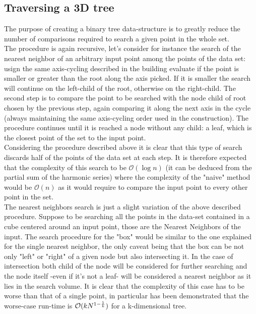 \subsection{Traversing a 3D tree}
The purpose of creating a binary tree data-structure is to greatly reduce the number of comparisons required to search a given point in the whole set.\\
The procedure is again recursive, let's consider for instance the search of the nearest neighbor of an arbitrary input point among the points of the data set: usign the same axis-cycling described in the building evaluate if the point is smaller or greater than the root along the axis picked. If it is smaller the search will continue on the left-child of the root, otherwise on the right-child. The second step is to compare the point to be searched with the node child of root chosen by the previous step, again comparing it along the next axis in the cycle (always maintaining the same axis-cycling order used in the construction). The procedure continues until it is reached a node without any child: a leaf, which is the closest point of the set to the input point.\\
Considering the procedure described above it is clear that this type of search discards half of the points of the data set at each step. It is therefore expected that the complexity of this search to be $\mathcal{O}(\log{} n)$ (it can be deduced from the partial sum of the harmonic series) where the complexity of the "naive" method would be $\mathcal{O}(n)$ as it would require to compare the input point to every other point in the set.\\
The nearest neighbors search is just a slight variation of the above described procedure. Suppose to be searching all the points in the data-set contained in a cube centered around an input point, those are the Nearest Neighbors of the input. The search procedure for the "box" would be similar to the one explained for the single nearest neighbor, the only caveat being that the box can be not only "left" or "right" of a given node but also intersecting it. In the case of intersection both child of the node will be considered for further searching and the node itself -even if it's not a leaf- will be considered a nearest neighbor as it lies in the search volume. It is clear that the complexity of this case has to be worse than that of a single point, in particular has been demonstrated \cite{worst-case-search} that the worse-case run-time is $\mathcal{O}(k N ^{1 - {1\over k}})$ for a k-dimensional tree.

